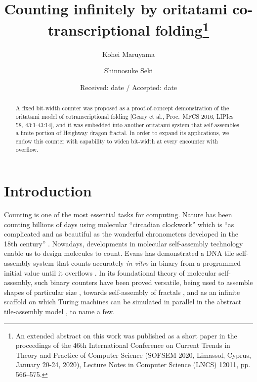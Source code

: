 \documentclass[twocolumn]{svjour3}
\begin{document}
\title{Counting infinitely by oritatami co-transcriptional folding\thanks{An extended abstract on this work was published as a short paper in the proceedings of the 46th International Conference on Current Trends in Theory and Practice of Computer Science (SOFSEM 2020, Limassol, Cyprus, January 20-24, 2020), Lecture Notes in Computer Science (LNCS) 12011, pp. 566--575.}}

\author{
Kohei Maruyama\and
Shinnosuke Seki
}

\date{Received: date / Accepted: date}

\maketitle


\begin{abstract}
A fixed bit-width counter was proposed as a proof-of-concept demonstration of the oritatami model of cotranscriptional folding [Geary et al., Proc.~MFCS 2016, LIPIcs 58, 43:1-43:14], and it was embedded into another oritatami system that self-assembles a finite portion of Heighway dragon fractal. 
In order to expand its applications, we endow this counter with capability to widen bit-width at every encounter with overflow. 
\end{abstract}

	\section{Introduction}

Counting is one of the most essential tasks for computing. %
Nature has been counting billions of days using molecular ``circadian clockwork'' which is ``as complicated and as beautiful as the wonderful chronometers developed in the 18th century''  \cite{McClung2006}. 
Nowadays, developments in molecular self-assembly technology enable us to design molecules to count. 
Evans has demonstrated a DNA tile self-assembly system that counts accurately \textit{in-vitro} in binary from a programmed initial value until it overflows \cite{EvansPhD}. 
In its foundational theory of molecular self-assembly, such binary counters have been proved versatile, being used to assemble shapes of particular size \cite{AdChGoHu2001,RothemundWinfree2000}, towards self-assembly of fractals \cite{MasudaSekiUbukata2018}, and as an infinite scaffold on which Turing machines can be simulated in parallel in the abstract tile-assembly model \cite{BrChDoKaSe2013,LathropLPS2011}, to name a few. 
\end{document}
